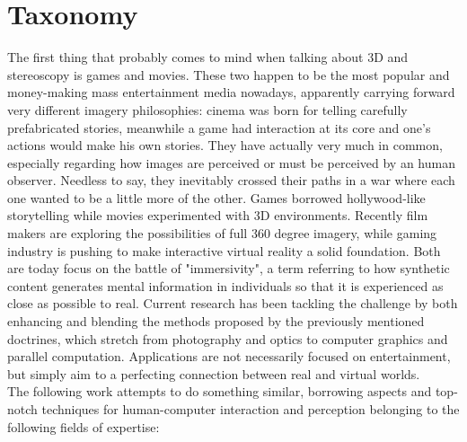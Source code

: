 \section{Taxonomy}
The first thing that probably comes to mind when talking about 3D and stereoscopy is games and movies. These two happen to be the most popular and money-making mass entertainment media nowadays, apparently carrying forward very different imagery philosophies: cinema was born for telling carefully prefabricated stories, meanwhile a game had interaction at its core and one's actions would make his own stories. They have actually very much in common, especially regarding how images are perceived or must be perceived by an human observer. Needless to say, they inevitably crossed their paths in a war where each one wanted to be a little more of the other. Games borrowed hollywood-like storytelling while movies experimented with 3D environments. Recently film makers are exploring the possibilities of full 360 degree imagery, while gaming industry is pushing to make interactive virtual reality a solid foundation. Both are today focus on the battle of "immersivity", a term referring to how synthetic content generates mental information in individuals so that it is experienced as close as possible to real.
Current research has been tackling the challenge by both enhancing and blending the methods proposed by the previously mentioned doctrines, which stretch from photography and optics to computer graphics and parallel computation. Applications are not necessarily focused on entertainment, but simply aim to a perfecting connection between real and virtual worlds.\\
The following work attempts to do something similar, borrowing aspects and top-notch techniques for human-computer interaction and perception belonging to the following fields of expertise:
